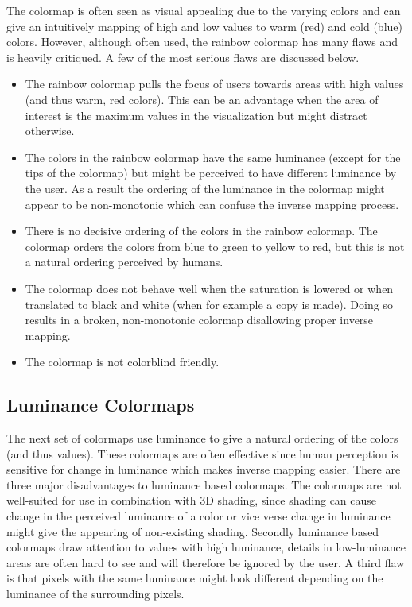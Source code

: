 The colormap is often seen as visual appealing due to the varying colors and can give an intuitively mapping of high and low values to warm (red) and cold (blue) colors. However, although often used, the rainbow colormap has many flaws and is heavily critiqued\cite{borland2007rainbow}\cite{divergingMoreland2009}. A few of the most serious flaws are discussed below.
\begin{itemize}
  \item The rainbow colormap pulls the focus of users towards areas with high values (and thus warm, red colors). This can be an advantage when the area of interest is the maximum values in the visualization but might distract otherwise.
  \item The colors in the rainbow colormap have the same luminance (except for the tips of the colormap) but might be perceived to have different luminance by the user. As a result the ordering of the luminance in the colormap might appear to be non-monotonic which can confuse the inverse mapping process.
  \item There is no decisive ordering of the colors in the rainbow colormap. The colormap orders the colors from blue to green to yellow to red, but this is not a natural ordering perceived by humans.
  \item The colormap does not behave well when the saturation is lowered or when translated to black and white (when for example a copy is made). Doing so results in a broken, non-monotonic colormap disallowing proper inverse mapping.
  \item The colormap is not colorblind friendly.
\end{itemize}



\subsection{Luminance Colormaps} %
\label{sub:luminance_colormaps}
The next set of colormaps use luminance to give a natural ordering of the colors (and thus values). These colormaps are often effective since human perception is sensitive for change in luminance\cite{divergingMoreland2009} which makes inverse mapping easier. There are three major disadvantages to luminance based colormaps. The colormaps are not well-suited for use in combination with 3D shading, since shading can cause change in the perceived luminance of a color or vice verse change in luminance might give the appearing of non-existing shading. Secondly luminance based colormaps draw attention to values with high luminance, details in low-luminance areas are often hard to see and will therefore be ignored by the user. A third flaw is that pixels with the same luminance might look different depending on the luminance of the surrounding pixels. 

